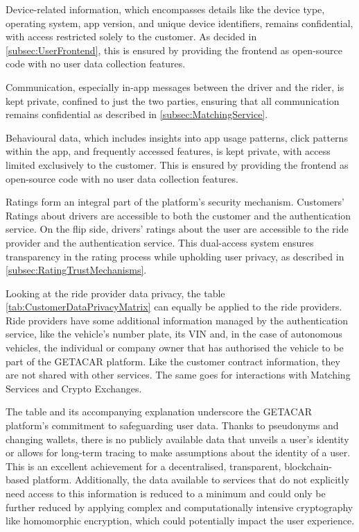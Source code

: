 Device-related information, which encompasses details like the device type, operating system, app version, and unique device identifiers, remains confidential, with access restricted solely to the customer. As decided in \ref{subsec:UserFrontend}, this is ensured by providing the frontend as open-source code with no user data collection features.

Communication, especially in-app messages between the driver and the rider, is kept private, confined to just the two parties, ensuring that all communication remains confidential as described in \ref{subsec:MatchingService}.

Behavioural data, which includes insights into app usage patterns, click patterns within the app, and frequently accessed features, is kept private, with access limited exclusively to the customer. This is ensured by providing the frontend as open-source code with no user data collection features.

Ratings form an integral part of the platform's security mechanism. Customers' Ratings about drivers are accessible to both the customer and the authentication service. On the flip side, drivers' ratings about the user are accessible to the ride provider and the authentication service. This dual-access system ensures transparency in the rating process while upholding user privacy, as described in \ref{subsec:RatingTrustMechanisms}.

Looking at the ride provider data privacy, the table \ref{tab:CustomerDataPrivacyMatrix} can equally be applied to the ride providers. Ride providers have some additional information managed by the authentication service, like the vehicle's number plate, its VIN and, in the case of autonomous vehicles, the individual or company owner that has authorised the vehicle to be part of the GETACAR platform. Like the customer contract information, they are not shared with other services. The same goes for interactions with Matching Services and Crypto Exchanges.

The table and its accompanying explanation underscore the GETACAR platform's commitment to safeguarding user data. Thanks to pseudonyms and changing wallets, there is no publicly available data that unveils a user's identity or allows for long-term tracing to make assumptions about the identity of a user. This is an excellent achievement for a decentralised, transparent, blockchain-based platform.  Additionally, the data available to services that do not explicitly need access to this information is reduced to a minimum and could only be further reduced by applying complex and computationally intensive cryptography like homomorphic encryption, which could potentially impact the user experience.

